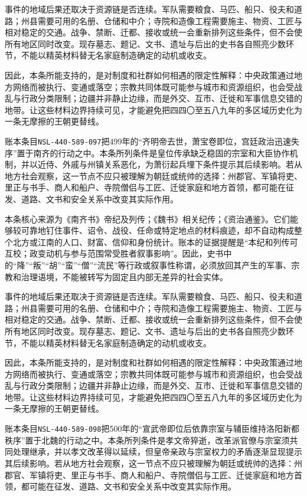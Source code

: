 事件的地域后果还取决于资源链是否连续。军队需要粮食、马匹、船只、役夫和道路；州县需要可用的名册、仓储和中介；寺院和造像工程需要施主、物资、工匠与相对稳定的交通。战争、禁断、迁都、接收或统一会重新排列这些条件，但不会使所有地区同时改变。现存墓志、题记、文书、遗址与后出的史书各自照亮少数环节，不能以精英材料替无名家庭制造确定的动机或收支。

因此，本条所能支持的，是对制度和社群如何相遇的限定性解释：中央政策通过地方网络而被执行、变通或落空；宗教共同体既可能参与城市和资源组织，也会受战乱与行政分类限制；边疆并非静止边缘，而是外交、互市、迁徙和军事信息交错的地带。让这些材料边界持续可见，才能避免把四四〇至五八九年的多区域历史化为一条无摩擦的王朝更替线。

账本条目\texttt{NSL-440-589-097}把499年的“齐明帝去世，萧宝卷即位，宫廷政治迅速失序”置于南齐的行动之中。本条所列条件是皇位传承缺乏稳固的宗室和大臣协作机制，并以近侍、外戚与州镇关系恶化，为萧衍起兵埋下条件提示其后续影响。若从地方社会观察，这一节点不应只被理解为朝廷或统帅的选择：州郡官、军镇将吏、里正与书手、商人和船户、寺院僧侣与工匠、迁徙家庭和地方首领，都可能在征发、道路、文书和安全关系中改变其实际作用。

本条核心来源为《南齐书》帝纪及列传；《魏书》相关纪传；《资治通鉴》。它们能够较可靠地钉住事件、诏令、战役、任命或特定地点的材料痕迹，却不自动构成整个北方或江南的人口、财富、信仰和身份统计。账本的证据提醒是“本纪和列传可互校；政变动机与参与范围常受胜者叙事影响”。因此，史书中的“降”“叛”“胡”“蛮”“僧”“流民”等行政或叙事性称谓，必须放回其产生的军事、宗教和治理语境，不能被转写为固定且内部无差异的社会实体。

事件的地域后果还取决于资源链是否连续。军队需要粮食、马匹、船只、役夫和道路；州县需要可用的名册、仓储和中介；寺院和造像工程需要施主、物资、工匠与相对稳定的交通。战争、禁断、迁都、接收或统一会重新排列这些条件，但不会使所有地区同时改变。现存墓志、题记、文书、遗址与后出的史书各自照亮少数环节，不能以精英材料替无名家庭制造确定的动机或收支。

因此，本条所能支持的，是对制度和社群如何相遇的限定性解释：中央政策通过地方网络而被执行、变通或落空；宗教共同体既可能参与城市和资源组织，也会受战乱与行政分类限制；边疆并非静止边缘，而是外交、互市、迁徙和军事信息交错的地带。让这些材料边界持续可见，才能避免把四四〇至五八九年的多区域历史化为一条无摩擦的王朝更替线。

账本条目\texttt{NSL-440-589-098}把500年的“宣武帝即位后依靠宗室与辅臣维持洛阳新都秩序”置于北魏的行动之中。本条所列条件是孝文帝猝逝，改革派官僚与宗室须共同处理继承，并以孝文改革得以延续，但皇帝亲政与宗室权力的矛盾逐渐显现提示其后续影响。若从地方社会观察，这一节点不应只被理解为朝廷或统帅的选择：州郡官、军镇将吏、里正与书手、商人和船户、寺院僧侣与工匠、迁徙家庭和地方首领，都可能在征发、道路、文书和安全关系中改变其实际作用。

